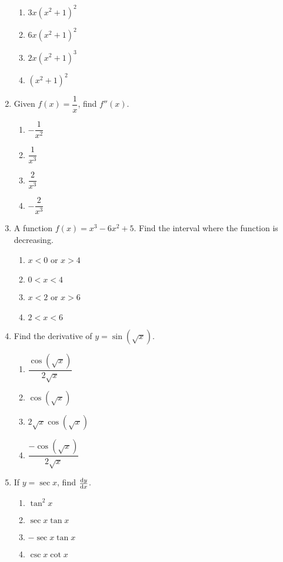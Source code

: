\begin{multicols}{2}
\begin{enumerate}[label={\arabic*.}]
      \begin{enumerate}[label={\Alph*.}]
        \item \(3x{(x^2+1)}^2\)
        \item \(6x{(x^2+1)}^2\)
        \item \(2x{(x^2+1)}^3\)
        \item \({(x^2+1)}^2\)
      \end{enumerate}
    \item Given \(f(x) = \dfrac{1}{x}\), find \(f''(x)\).
      \begin{enumerate}[label={\Alph*.}]
        \item \(-\dfrac{1}{x^2}\)
        \item \(\dfrac{1}{x^3}\)
        \item \(\dfrac{2}{x^3}\)
        \item \(-\dfrac{2}{x^3}\)
      \end{enumerate}
    \item A function \(f(x) = x^3 - 6x^2 + 5\). Find the interval where the function is decreasing.
      \begin{enumerate}[label={\Alph*.}]
        \item \(x<0\) or \(x>4\)
        \item \(0<x<4\)
        \item \(x<2\) or \(x>6\)
        \item \(2<x<6\)
      \end{enumerate}
    \item Find the derivative of \(y = \sin(\sqrt{x})\).
      \begin{enumerate}[label={\Alph*.}]
        \item \(\dfrac{\cos(\sqrt{x})}{2\sqrt{x}}\)
        \item \(\cos(\sqrt{x})\)
        \item \(2\sqrt{x}\cos(\sqrt{x})\)
        \item \(\dfrac{-\cos(\sqrt{x})}{2\sqrt{x}}\)
      \end{enumerate}
    \item If \(y = \sec x\), find \(\frac{\mathrm{d}y}{\mathrm{d}x}\).
      \begin{enumerate}[label={\Alph*.}]
        \item \(\tan^2 x\)
        \item \(\sec x \tan x\)
        \item \(-\sec x \tan x\)
        \item \(\csc x \cot x\)
      \end{enumerate}

\end{enumerate}
\end{multicols}

